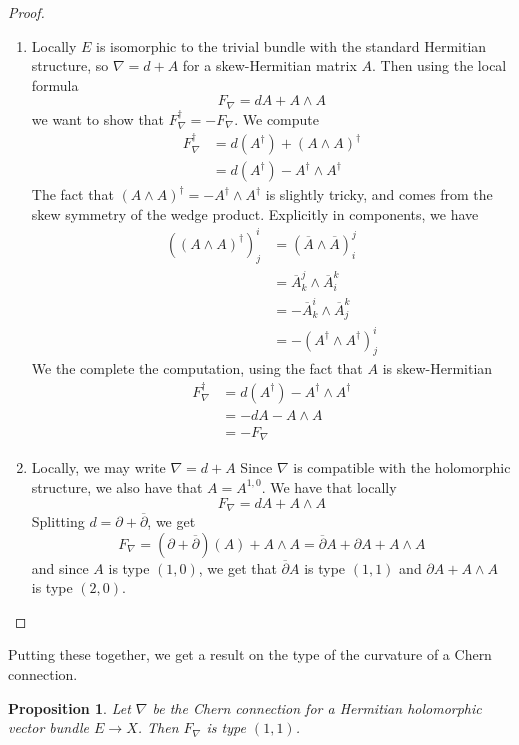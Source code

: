 \documentclass[psamsfonts, 12pt]{amsart}
\newtheorem{prop}[thm]{Proposition}
\theoremstyle{definition}
\theoremstyle{remark}
\newcommand{\dbar}{\overline{\partial}}
\newcommand{\enumbreak}{\ \\ \vspace{-\baselineskip}}
\begin{document}
%
\begin{proof} \enumbreak
\begin{enumerate}
  \item Locally $E$ is isomorphic to the trivial bundle with the standard Hermitian
  structure, so $\nabla = d + A$ for a skew-Hermitian matrix $A$. Then using
  the local formula
  \[
  F_\nabla = dA + A \wedge A
  \]
  we want to show that $F_\nabla^\dagger = -F_\nabla$. We compute
  \begin{align*}
  F_\nabla^\dagger &= d(A^\dagger) + (A \wedge A)^\dagger \\
  &= d(A^\dagger) - A^\dagger \wedge A^\dagger
  \end{align*}
  The fact that $(A\wedge A)^\dagger = -A^\dagger \wedge A^\dagger$ is slightly tricky,
  and comes from the skew symmetry of the wedge product. Explicitly in components,
  we have
  \begin{align*}
  ((A \wedge A)^\dagger)^i_j &= (\overline{A} \wedge \overline{A})^j_i \\
  &= \overline{A}^j_k \wedge \overline{A}^k_i \\
  &= -\overline{A}^i_k \wedge \overline{A}^k_j \\
  &= - (A^\dagger \wedge A^\dagger)^i_j
  \end{align*}
  We the complete the computation, using the fact that $A$ is skew-Hermitian
  \begin{align*}
  F_\nabla^\dagger &= d(A^\dagger) - A^\dagger \wedge A^\dagger \\
  &= -dA - A \wedge A \\
  &= -F_\nabla
  \end{align*}
  \item Locally, we may write $\nabla = d + A$ Since $\nabla$ is compatible with the
  holomorphic structure, we also have that $A = A^{1,0}$. We have that locally
  \[
  F_\nabla = dA + A \wedge A
  \]
  Splitting $d = \partial + \dbar$, we get
  \[
  F_\nabla = (\partial + \dbar)(A) + A \wedge A = \dbar A + \partial A + A \wedge A
  \]
  and since $A$ is type $(1,0)$, we get that $\dbar A$ is type $(1,1)$ and
  $\partial A + A \wedge A$ is type $(2,0)$.
\end{enumerate}
\end{proof}
%
Putting these together, we get a result on the type of the curvature of a Chern connection.
%
\begin{prop}
Let $\nabla$ be the Chern connection for a Hermitian holomorphic vector bundle
$E \to X$. Then $F_\nabla$ is type $(1,1)$.
\end{prop}
\end{document}
